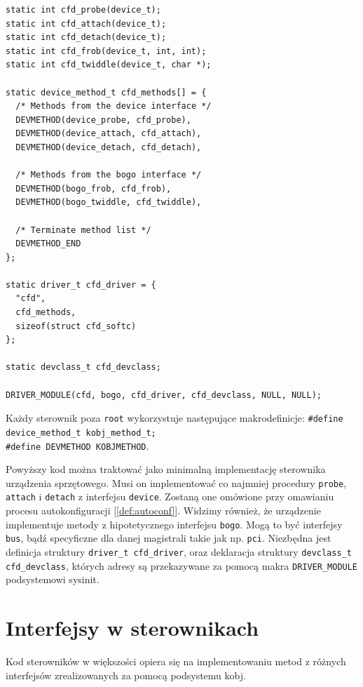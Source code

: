 \documentclass[shortabstract,inz]{iithesis}
\begin{document}
\begin{lstlisting}[caption=Szkielet kodu sterownika]
static int cfd_probe(device_t);
static int cfd_attach(device_t);
static int cfd_detach(device_t);
static int cfd_frob(device_t, int, int);
static int cfd_twiddle(device_t, char *);

static device_method_t cfd_methods[] = {
  /* Methods from the device interface */
  DEVMETHOD(device_probe, cfd_probe),
  DEVMETHOD(device_attach, cfd_attach),
  DEVMETHOD(device_detach, cfd_detach),

  /* Methods from the bogo interface */
  DEVMETHOD(bogo_frob, cfd_frob),
  DEVMETHOD(bogo_twiddle, cfd_twiddle),

  /* Terminate method list */
  DEVMETHOD_END
};

static driver_t cfd_driver = {
  "cfd",
  cfd_methods,
  sizeof(struct cfd_softc)
};

static devclass_t cfd_devclass;

DRIVER_MODULE(cfd, bogo, cfd_driver, cfd_devclass, NULL, NULL);
\end{lstlisting}

Każdy sterownik poza \texttt{root} wykorzystuje następujące makrodefinicje:
\texttt{\#define device\_method\_t     kobj\_method\_t;} \\
\texttt{\#define	DEVMETHOD	KOBJMETHOD}.

Powyższy kod można traktować jako minimalną implementację sterownika urządzenia sprzętowego.
Musi on implementować co najmniej procedury \texttt{probe}, \texttt{attach} i \texttt{detach} 
z interfejsu \texttt{device}. Zostaną one omówione przy omawianiu procesu autokonfiguracji [\ref{def:autoconf}].
Widzimy również, że urządzenie implementuje metody z hipotetycznego interfejsu \texttt{bogo}.
Mogą to być interfejsy \texttt{bus}, bądź specyficzne dla danej magistrali takie jak np. \texttt{pci}.
Niezbędna jest definicja struktury \texttt{driver\_t cfd\_driver}, oraz deklaracja
struktury \texttt{devclass\_t cfd\_devclass}, których adresy
są przekazywane za pomocą makra \texttt{DRIVER\_MODULE} podsystemowi sysinit.





\section{Interfejsy w sterownikach} %
\label{sec:interfaces}

Kod sterowników w większości opiera się na implementowaniu metod z różnych interfejsów
zrealizowanych za pomocą podsystemu kobj.
\end{document}
